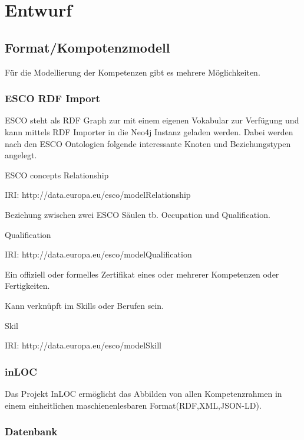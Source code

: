 \section{Entwurf}\label{entwurf}
\subsection{Format/Kompotenzmodell}

Für die Modellierung der Kompetenzen gibt es mehrere Möglichkeiten. 

\subsubsection{ESCO RDF Import}

ESCO steht als RDF Graph zur mit einem eigenen Vokabular zur Verfügung und kann mittels RDF Importer in die Neo4j Instanz geladen werden. Dabei werden nach den ESCO Ontologien folgende interessante Knoten und Beziehungstypen angelegt. 

ESCO concepts Relationship

IRI: http://data.europa.eu/esco/modelRelationship


Beziehung zwischen zwei ESCO Säulen tb. Occupation und Qualification.

Qualification 

IRI: http://data.europa.eu/esco/modelQualification

Ein offiziell oder formelles Zertifikat eines oder mehrerer Kompetenzen oder Fertigkeiten.

Kann verknüpft im Skills oder Berufen sein.

Skil 

IRI: http://data.europa.eu/esco/modelSkill



\subsubsection{inLOC}

Das Projekt InLOC ermöglicht das Abbilden von allen Kompetenzrahmen in einem einheitlichen maschienenlesbaren Format(RDF,XML,JSON-LD).


\subsubsection{Datenbank}

